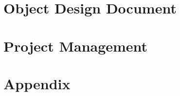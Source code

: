 \documentclass{article}
\begin{document}
\section{Object Design Document}
	
\section{Project Management}
	

	\section{Appendix}
\end{document}
